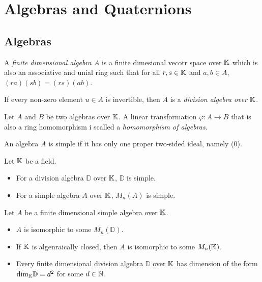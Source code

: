 \chapter{Algebras and Quaternions}

\section{Algebras}

\begin{definition}
  A {\it finite dimensional algebra \(A\)} is a finite dimesional vecotr space over \(\mathbb{K}\)
  which is also an associative and unial ring such that for all \(r,s\in\mathbb{K}\) and
  \(a,b\in A\), \((ra)(sb)=(rs)(ab)\).
\end{definition}

If every non-zero element \(u\in A\) is invertible, then \(A\) is a {\it division algebra over \(\mathbb{K}\)}.

\begin{definition}
  Let \(A\) and \(B\) be two algebras over \(\mathbb{K}\). A linear transformation \(\varphi:A\longrightarrow B\)
  that is also a ring homomorphism i scalled a {\it homomorphism of algebras}.
\end{definition}

\begin{definition}
  An algebra \(A\) is simple if it has only one proper two-sided ideal, namely
  (0).
\end{definition}

\begin{proposition}
  Let \(\mathbb{K}\) be a field.
  \begin{itemize}
    \item[\((i)\)] For a division algebra \(\mathbb{D}\) over \(\mathbb{K}\), \(\mathbb{D}\) is
      simple.
    \item[\((ii)\)] For a simple algebra \(A\) over \(\mathbb{K}\), \(M_n(A)\) is simple.
  \end{itemize}
\end{proposition}

\begin{theorem}
  Let \(A\) be a finite dimensional simple algebra over \(\mathbb{K}\).
  \begin{itemize}
    \item[\((i)\)] \(A\) is isomorphic to some \(M_n(\mathbb{D})\).
    \item[\((ii)\)] If \(\mathbb{K}\) is algenraically closed, then \(A\) is isomorphic to some
      \(M_n(\mathbb{K})\).
    \item[\((i)\)] Every finite dimensional division algebra \(\mathbb{D}\) over \(\mathbb{K}\) has
      dimension of the form \(\text{dim}_{\mathbb{K}}\mathbb{D}=d^2\) for some \(d\in\mathbb{N}\).
  \end{itemize}
\end{theorem}

